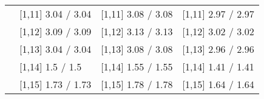 \begin{table}
\begin{tabular}[t]{llll}
 & {}[1,11] 3.04  / 3.04 & {}[1,11] 3.08  / 3.08 & {}[1,11] 2.97  / 2.97\\
 & {}[1,12] 3.09  / 3.09 & {}[1,12] 3.13  / 3.13 & {}[1,12] 3.02  / 3.02\\
\addlinespace
 & {}[1,13] 3.04  / 3.04 & {}[1,13] 3.08  / 3.08 & {}[1,13] 2.96  / 2.96\\
 & {}[1,14] 1.5  / 1.5 & {}[1,14] 1.55  / 1.55 & {}[1,14] 1.41  / 1.41\\
 & {}[1,15] 1.73  / 1.73 & {}[1,15] 1.78  / 1.78 & {}[1,15] 1.64  / 1.64\\
\bottomrule
\end{tabular}
\end{table}
